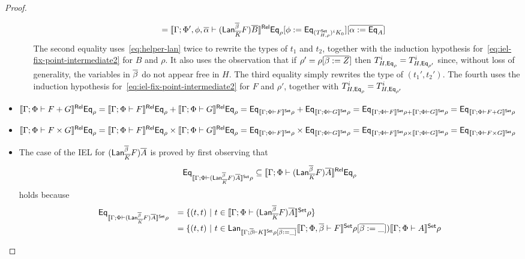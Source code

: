 \documentclass[acmsmall,review,anonymous]{acmart}
\theoremstyle{definition}
\begin{document}
\begin{proof}
\begin{itemize}
\begin{itemize}
{\begin{align*}
  &=\llbracket{\Gamma;\Phi',\phi,\overline{\alpha}
    \vdash (\mathsf{Lan}_{\overline{K}}^{\overline{\beta}} F)\overline{B}}\rrbracket^{\mathsf{Rel}}  \mathsf{Eq}_{\rho} [\phi :=
   \mathsf{Eq}_{(T^{\mathsf{Set}}_{H,\rho})^i
      K_0}] [\overline{\alpha := \mathsf{Eq}_A}]
\end{align*}
The second equality uses~\eqref{eq:helper-lan} twice to rewrite the
types of $t_1$ and $t_2$, together with the induction hypothesis
for~\eqref{eq:iel-fix-point-intermediate2} for $B$ and $\rho$. It also
uses the observation that if $\rho' = \rho[\overline{\beta := Z}]$ then
$T^i_{H,\mathsf{Eq}_\rho} = T^i_{H,\mathsf{Eq}_{\rho'}}$ since, without loss of
generality, the variables in $\overline{\beta}$ do not appear free in $H$. The
third equality simply rewrites the type of $(t_1',t_2')$.  The fourth
uses the induction hypothesis
for~\eqref{eq:iel-fix-point-intermediate2} for $F$ and $\rho'$,
together with $T^i_{H,\mathsf{Eq}_\rho} = T^i_{H,\mathsf{Eq}_{\rho'}}$ }
\end{itemize}
\item $\llbracket{\Gamma; \Phi \vdash F + G}\rrbracket^{\mathsf{Rel}} \mathsf{Eq}_{\rho} =
  \llbracket{\Gamma; \Phi \vdash F}\rrbracket^{\mathsf{Rel}} \mathsf{Eq}_{\rho} + \llbracket{\Gamma;
    \Phi \vdash G}\rrbracket^{\mathsf{Rel}} \mathsf{Eq}_{\rho} = \mathsf{Eq}_{\llbracket{\Gamma; \Phi \vdash
      F}\rrbracket^{\mathsf{Set}}\rho} + \mathsf{Eq}_{\llbracket{\Gamma; \Phi \vdash G}\rrbracket^{\mathsf{Set}}\rho} =
  \mathsf{Eq}_{\llbracket{\Gamma; \Phi \vdash F}\rrbracket^{\mathsf{Set}}\rho + \llbracket{\Gamma; \Phi
      \vdash G}\rrbracket^{\mathsf{Set}}\rho} = \mathsf{Eq}_{\llbracket{\Gamma; \Phi \vdash F +
      G}\rrbracket^{\mathsf{Set}}\rho}$
\item $\llbracket{\Gamma; \Phi \vdash F \times G}\rrbracket^{\mathsf{Rel}} \mathsf{Eq}_{\rho} =
  \llbracket{\Gamma; \Phi \vdash F}\rrbracket^{\mathsf{Rel}}\mathsf{Eq}_{\rho} \times \llbracket{\Gamma;
    \Phi \vdash G}\rrbracket^{\mathsf{Rel}}\mathsf{Eq}_{\rho} = \mathsf{Eq}_{\llbracket{\Gamma; \Phi \vdash
      F}\rrbracket^{\mathsf{Set}}\rho} \times \mathsf{Eq}_{\llbracket{\Gamma; \Phi \vdash G}\rrbracket^{\mathsf{Set}}\rho}
  = \mathsf{Eq}_{\llbracket{\Gamma; \Phi \vdash F}\rrbracket^{\mathsf{Set}}\rho \times
    \llbracket{\Gamma; \Phi \vdash G}\rrbracket^{\mathsf{Set}}\rho} = \mathsf{Eq}_{\llbracket{\Gamma;
      \Phi \vdash F \times G}\rrbracket^{\mathsf{Set}}\rho}$
\item The case of the IEL for $(\mathsf{Lan}_{\overline{K}}^{\overline{\beta}} F)\overline{A}$ is proved
  by first observing that \[\mathsf{Eq}_{\llbracket{\Gamma; \Phi \vdash
      (\mathsf{Lan}_{\overline{K}}^{\overline{\beta}} F)\overline{A}}\rrbracket^{\mathsf{Set}}\rho} \subseteq
  \llbracket{\Gamma; \Phi \vdash (\mathsf{Lan}_{\overline{K}}^{\overline{\beta}}
    F)\overline{A}}\rrbracket^{\mathsf{Rel}}\mathsf{Eq}_\rho\] holds because
  \[\begin{array}{ll}
\mathsf{Eq}_{\llbracket{\Gamma; \Phi \vdash (\mathsf{Lan}_{\overline{K}}^{\overline{\beta}}
    F)\overline{A}}\rrbracket^{\mathsf{Set}}\rho} &= \{(t,t)~|~t \in \llbracket{\Gamma;\Phi \vdash
  (\mathsf{Lan}_{\overline{K}}^{\overline{\beta}} F)\overline{A}}\rrbracket^{\mathsf{Set}}\rho\}\\
&= \{(t,t)~|~t \in \mathsf{Lan}_{\llbracket{\Gamma;\overline{\beta} \vdash K}\rrbracket^{\mathsf{Set}}\rho[\overline{\beta
    := \_]}} \llbracket{\Gamma;\Phi,\overline{\beta} \vdash F}\rrbracket^{\mathsf{Set}}\rho[\overline{\beta :=
    \_}])\llbracket{\Gamma;\Phi \vdash A}\rrbracket^{\mathsf{Set}}\rho\\

\end{array}\]
\end{itemize}
\end{proof}
\end{document}
